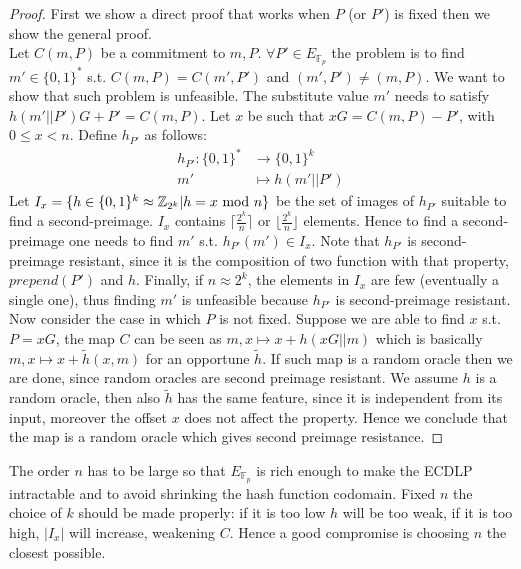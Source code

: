 \begin{proof}
	First we show a direct proof that works when $P$ (or $P'$) is fixed then we show the general proof.
	\\
	Let $C(m,P)$ be a commitment to $m, P$.
	$\forall P' \in E_{\mathbb{F}_p}$ the problem is to find $m' \in \{0,1\}^*$ s.t. $C(m,P)=C(m',P')$ and $(m', P') \neq (m, P)$. We want to show that such problem is unfeasible.
	The substitute value $m'$ needs to satisfy $h(m'||P')G + P'=C(m,P)$.
	Let $x$ be such that $xG = C(m,P) - P'$, with $0\leq x<n$. 
	Define $h_{P'}$ as follows:
	\begin{equation}
	\begin{split}
	h_{P'}:\{0,1\}^* & \rightarrow \{0,1\}^k\\
	m' & \mapsto h(m'||P')
	\end{split}
	\end{equation}
	Let $I_x=\{h \in \{0,1\}^k \approx \mathbb{Z}_{2^k} | h=x\textmd{ mod }n\}$ be the set of images of $h_{P'}$ suitable to find a second-preimage.
	$I_x$ contains  $\lceil\frac{2^k}{n}\rceil$ or $\lfloor\frac{2^k}{n}\rfloor$ elements.
	Hence to find a second-preimage one needs to find $m'$ s.t. $h_{P'}(m') \in I_x$. Note that $h_{P'}$ is second-preimage resistant, since it is the composition of two function with that property, $prepend(P')$ and $h$. Finally, if $n \approx 2^k$, the elements in $I_x$ are few (eventually a single one), thus finding $m'$ is unfeasible because $h_{P'}$ is second-preimage resistant.
	\\
	Now consider the case in which $P$ is not fixed.
	Suppose we are able to find $x$ s.t. $P=xG$, the map $C$ can be seen as $m,x \mapsto x + h(xG||m)$ which is basically $m,x \mapsto x + \tilde{h}(x,m)$ for an opportune $\tilde{h}$.
	If such map is a random oracle then we are done, since random oracles are second preimage resistant.
	We assume $h$ is a random oracle, then also $\tilde{h}$ has the same feature, since it is independent from its input, moreover the offset $x$ does not affect the property. 
	Hence we conclude that the map is a random oracle which gives second preimage resistance.
\end{proof}

The order $n$ has to be large so that $E_{\mathbb{F}_p}$ is rich enough to make the ECDLP intractable and to avoid shrinking the hash function codomain. Fixed $n$ the choice of $k$ should be made properly: if it is too low $h$ will be too weak, if it is too high, $|I_x|$ will increase, weakening $C$. Hence a good compromise is choosing $n$ the closest possible.

